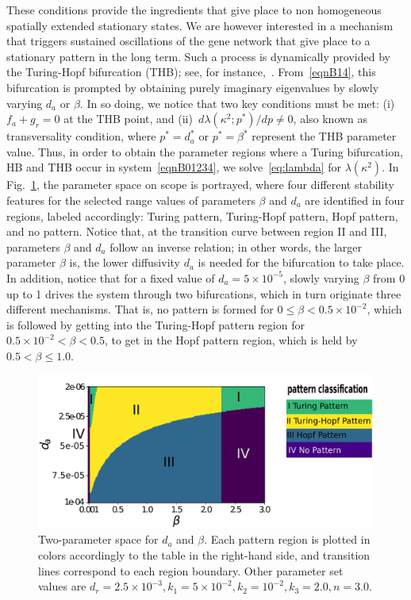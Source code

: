 \documentclass[%
 preprint,
 amsmath,amssymb,
 aps,
]{revtex4-2}
\begin{document}
These conditions provide the ingredients that give place to non homogeneous spatially extended stationary states. We are however interested in a mechanism that triggers sustained oscillations of the gene network that give place to a stationary pattern in the long term. Such a process is dynamically provided by the Turing-Hopf bifurcation (THB); see, for instance,~\citep{Castillo2016, liu}. From~\eqref{eqnB14}, this bifurcation is prompted by obtaining purely imaginary eigenvalues by slowly varying $d_a$ or $\beta$. In so doing, we notice that two key conditions must be met: (i)~$f_a + g_r=0$ at the THB point, and (ii)~$d\lambda(\kappa^2;p^*)/dp\neq0$, also known as transversality condition, where $p^*=d_a^*$ or $p^*=\beta^*$ represent the THB parameter value. Thus, in order to obtain the parameter regions where a Turing bifurcation, HB and THB occur in system~\eqref{eqnB01234}, we solve~\eqref{eq:lambda} for $\lambda(\kappa^2)$. In Fig.~\ref{FigB01}, the parameter space on scope is portrayed, where four different stability features for the selected range values of parameters $\beta$ and $d_a$ are identified in four regions, labeled accordingly: Turing pattern, Turing-Hopf pattern, Hopf pattern, and no pattern. Notice that, at the transition curve between region II and III, parameters $\beta$ and $d_a$ follow an inverse relation; in other words, the larger parameter $\beta$ is, the lower diffusivity $d_a$ is needed for the bifurcation to take place. In addition, notice that for a fixed value of $d_a=5\times10^{-5}$, slowly varying $\beta$ from 0 up to 1 drives the system through two bifurcations, which in turn originate three different mechanisms. That is, no pattern is formed for $0\leq\beta < 0.5\times10^{-2}$, which is followed by getting into the Turing-Hopf pattern region for $ 0.5\times10^{-2}<\beta<0.5$, to get in the Hopf pattern region, which is held by $ 0.5<\beta\leq 1.0$. 

\begin{figure}[t!]
	\centering
	\includegraphics[width=5.0in]{Figures/ApFigure01}
	\caption{Two-parameter space for $d_a$ and $\beta$. Each pattern region is plotted in colors accordingly to the table in the right-hand side, and transition lines correspond to each region boundary. Other parameter set values are $d_r = 2.5\times10^{-3}, k_1 = 5\times10^{-2}, k_2=10^{-2}, k_3=2.0, n=3.0$.}
	\label{FigB01}
\end{figure}
\end{document}
